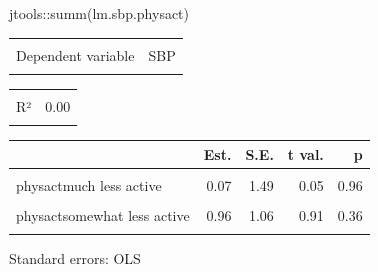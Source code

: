 \documentclass[
  letterpaper,
  DIV=11,
  numbers=noendperiod]{scrreport}
\newenvironment{Shaded}{\begin{snugshade}}{\end{snugshade}}
\newcommand{\FunctionTok}[1]{\textcolor[rgb]{0.28,0.35,0.67}{#1}}
\newcommand{\NormalTok}[1]{\textcolor[rgb]{0.00,0.23,0.31}{#1}}
\newcommand{\SpecialCharTok}[1]{\textcolor[rgb]{0.37,0.37,0.37}{#1}}
\begin{document}
\begin{Shaded}
\begin{Highlighting}[]
\NormalTok{jtools}\SpecialCharTok{::}\FunctionTok{summ}\NormalTok{(lm.sbp.physact)}
\end{Highlighting}
\end{Shaded}

\begin{table}[!h]
\centering
\begin{tabular}{lr}
\toprule
\cellcolor{gray!6}{Observations} & \cellcolor{gray!6}{2763}\\
Dependent variable & SBP\\
\cellcolor{gray!6}{Type} & \cellcolor{gray!6}{OLS linear regression}\\
\bottomrule
\end{tabular}
\end{table} \begin{table}[!h]
\centering
\begin{tabular}{lr}
\toprule
\cellcolor{gray!6}{F(4,2758)} & \cellcolor{gray!6}{0.48}\\
R² & 0.00\\
\cellcolor{gray!6}{Adj. R²} & \cellcolor{gray!6}{-0.00}\\
\bottomrule
\end{tabular}
\end{table} \begin{table}[!h]
\centering
\begin{threeparttable}
\begin{tabular}{lrrrr}
\toprule
  & Est. & S.E. & t val. & p\\
\midrule
\cellcolor{gray!6}{(Intercept)} & \cellcolor{gray!6}{135.00} & \cellcolor{gray!6}{0.63} & \cellcolor{gray!6}{215.01} & \cellcolor{gray!6}{0.00}\\
physactmuch less active & 0.07 & 1.49 & 0.05 & 0.96\\
\cellcolor{gray!6}{physactmuch more active} & \cellcolor{gray!6}{-0.90} & \cellcolor{gray!6}{1.26} & \cellcolor{gray!6}{-0.72} & \cellcolor{gray!6}{0.47}\\
physactsomewhat less active & 0.96 & 1.06 & 0.91 & 0.36\\
\cellcolor{gray!6}{physactsomewhat more active} & \cellcolor{gray!6}{-0.05} & \cellcolor{gray!6}{0.91} & \cellcolor{gray!6}{-0.05} & \cellcolor{gray!6}{0.96}\\
\bottomrule
\end{tabular}
\begin{tablenotes}
\item Standard errors: OLS
\end{tablenotes}
\end{threeparttable}
\end{table}
\end{document}
